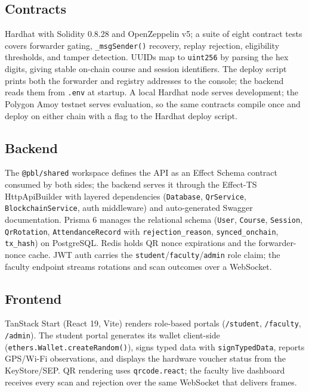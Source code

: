 \documentclass[conference]{IEEEtran}
\begin{document}
\subsection{Contracts}
Hardhat with Solidity 0.8.28 and OpenZeppelin v5; a suite of eight contract
tests covers forwarder gating, \texttt{\_msgSender()} recovery, replay
rejection, eligibility thresholds, and tamper detection. UUIDs map to
\texttt{uint256} by parsing the hex digits, giving stable on-chain course and
session identifiers. The deploy script prints both the forwarder and registry
addresses to the console; the backend reads them from \texttt{.env} at
startup. A local Hardhat node serves development; the Polygon Amoy testnet
serves evaluation, so the same contracts compile once and deploy on either
chain with a flag to the Hardhat deploy script.

\subsection{Backend}
The \texttt{@pbl/shared} workspace defines the API as an Effect Schema
contract consumed by both sides; the backend serves it through the Effect-TS
HttpApiBuilder with layered dependencies (\texttt{Database},
\texttt{QrService}, \texttt{BlockchainService}, auth middleware) and
auto-generated Swagger documentation. Prisma 6 manages the relational schema
(\texttt{User}, \texttt{Course}, \texttt{Session}, \texttt{QrRotation},
\texttt{AttendanceRecord} with \texttt{rejection\_reason},
\texttt{synced\_onchain}, \texttt{tx\_hash}) on PostgreSQL. Redis holds QR
nonce expirations and the forwarder-nonce cache. JWT auth carries the
\texttt{student}/\texttt{faculty}/\texttt{admin} role claim; the faculty
endpoint streams rotations and scan outcomes over a WebSocket.

\subsection{Frontend}
TanStack Start (React 19, Vite) renders role-based portals
(\texttt{/student}, \texttt{/faculty}, \texttt{/admin}). The student portal
generates its wallet client-side (\texttt{ethers.Wallet.createRandom()}),
signs typed data with \texttt{signTypedData}, reports GPS/Wi-Fi observations,
and displays the hardware voucher status from the KeyStore/SEP. QR rendering
uses \texttt{qrcode.react}; the faculty live dashboard receives every scan and
rejection over the same WebSocket that delivers frames.

\end{document}
